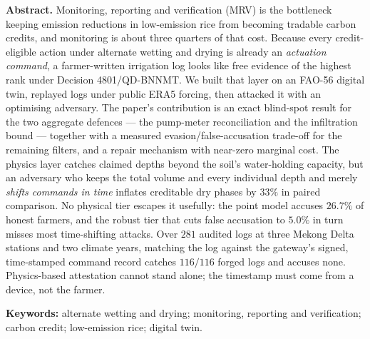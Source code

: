   \vspace{6pt}
  \begin{hujosabstract}
  \noindent\textbf{Abstract.} Monitoring, reporting and verification (MRV) is the bottleneck keeping emission
 reductions in low-emission rice from becoming tradable carbon credits, and
 monitoring is about three quarters of that cost. Because every credit-eligible
 action under alternate wetting and drying is already an \emph{actuation command},
 a farmer-written irrigation log looks like free evidence of the highest rank under
 Decision 4801/QD-BNNMT. We built that layer on an FAO-56 digital twin, replayed logs under public ERA5 forcing, then attacked it with an optimising adversary. The paper's contribution is an exact blind-spot result for the two aggregate
 defences --- the pump-meter reconciliation and the infiltration bound --- together
 with a measured evasion/false-accusation trade-off for the remaining filters, and a
 repair mechanism with near-zero marginal cost. The physics layer catches claimed depths beyond the soil's water-holding capacity, but an adversary who keeps the
 total volume and every individual depth and merely \emph{shifts commands in time}
 inflates creditable dry phases by $33\%$ in paired comparison. No physical tier
 escapes it usefully: the point model accuses $26.7\%$ of honest farmers, and the
 robust tier that cuts false accusation to $5.0\%$ in turn misses most
 time-shifting attacks. Over $281$ audited logs at three Mekong Delta stations
 and two climate years, matching the log against the gateway's signed,
 time-stamped command record catches $116/116$ forged logs and accuses none.
 Physics-based attestation cannot stand alone; the timestamp must come from
 a device, not the farmer.

 \vspace{4pt}
 \noindent\textbf{Keywords:} alternate wetting and drying; monitoring, reporting
  and verification; carbon credit; low-emission rice; digital twin.

  \vspace{10pt}
  \end{hujosabstract}
\endgroup







